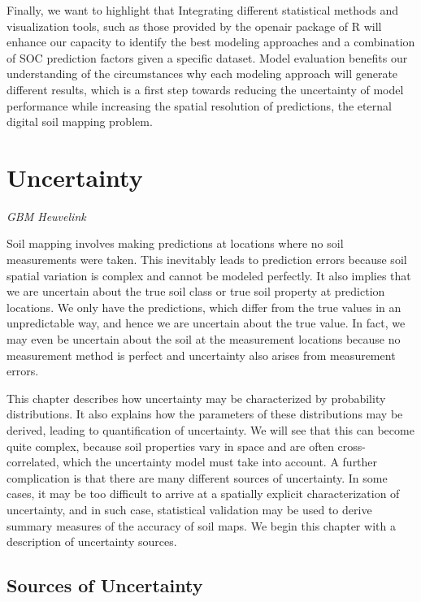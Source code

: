 \documentclass[10pt,b5paper,]{book}
\theoremstyle{definition}
\theoremstyle{definition}
\theoremstyle{definition}
\theoremstyle{remark}
\begin{document}
Finally, we want to highlight that Integrating different statistical
methods and visualization tools, such as those provided by the openair
package of R \citep{openair} will enhance our capacity to identify the
best modeling approaches and a combination of SOC prediction factors
given a specific dataset. Model evaluation benefits our understanding of
the circumstances why each modeling approach will generate different
results, which is a first step towards reducing the uncertainty of model
performance while increasing the spatial resolution of predictions, the
eternal digital soil mapping problem.

\hypertarget{uncertainty}{%
\chapter{Uncertainty}\label{uncertainty}}

\emph{GBM Heuvelink}

Soil mapping involves making predictions at locations where no soil
measurements were taken. This inevitably leads to prediction errors
because soil spatial variation is complex and cannot be modeled
perfectly. It also implies that we are uncertain about the true soil
class or true soil property at prediction locations. We only have the
predictions, which differ from the true values in an unpredictable way,
and hence we are uncertain about the true value. In fact, we may even be
uncertain about the soil at the measurement locations because no
measurement method is perfect and uncertainty also arises from
measurement errors.

This chapter describes how uncertainty may be characterized by
probability distributions. It also explains how the parameters of these
distributions may be derived, leading to quantification of uncertainty.
We will see that this can become quite complex, because soil properties
vary in space and are often cross-correlated, which the uncertainty
model must take into account. A further complication is that there are
many different sources of uncertainty. In some cases, it may be too
difficult to arrive at a spatially explicit characterization of
uncertainty, and in such case, statistical validation may be used to
derive summary measures of the accuracy of soil maps. We begin this
chapter with a description of uncertainty sources.

\hypertarget{sourcesuncert}{%
\section{Sources of Uncertainty}\label{sourcesuncert}}
\end{document}
